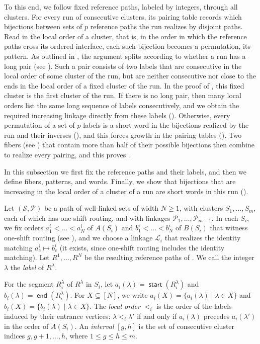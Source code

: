 \documentclass[fontsize=12pt,leading=14pt]{fullpaper}
\DeclareMathOperator{\st}{\mathsf{start}}
\DeclareMathOperator{\en}{\mathsf{end}}
\newcommand{\Lcal}{\mathcal{L}}
\newcommand{\Pcal}{\mathcal{P}}
\newcommand{\Scal}{\mathcal{S}}
\newcounter{step}
\begin{document}
To this end, we follow fixed reference paths, labeled by integers, through all clusters.
For every run of consecutive clusters, its pairing table records which bijections between sets of $p$ reference paths the run realizes by disjoint paths.
Read in the local order of a cluster, that is, in the order in which the reference paths cross its ordered interface, each such bijection becomes a permutation, its pattern.
As outlined in , the argument splits according to whether a run has a long pair (see ).
Such a pair consists of two labels that are consecutive in the local order of some cluster of the run, but are neither consecutive nor close to the ends in the local order of a fixed cluster of the run.
In the proof of , this fixed cluster is the first cluster of the run.
If there is no long pair, then many local orders list the same long sequence of labels consecutively, and we obtain the required increasing linkage directly from these labels ().
Otherwise, every permutation of a set of $p$ labels is a short word in the bijections realized by the run and their inverses (), and this forces growth in the pairing tables ().
Two fibers (see ) that contain more than half of their possible bijections then combine to realize every pairing, and this proves .

In this subsection we first fix the reference paths and their labels, and then we define fibers, patterns, and words.
Finally, we show that bijections that are increasing in the local order of a cluster of a run are short words in this run ().

\begin{definition}\label{def:s3-oneshift-refs}
  Let $(\Scal,\Pcal)$ be a path of well-linked sets of width $N\ge1$, with clusters $S_1,\dots,S_m$, each of which has one-shift routing, and with linkages $\Pcal_1,\dots,\Pcal_{m-1}$.
  In each $S_i$, we fix orders $a^i_1<\dots<a^i_N$ of $A(S_i)$ and $b^i_1<\dots<b^i_N$ of $B(S_i)$ that witness one-shift routing (see ), and we choose a linkage $\Lcal_i$ that realizes the identity matching $a^i_c\mapsto b^i_c$ (it exists, since one-shift routing includes the identity matching).
  Let $R^1,\dots,R^N$ be the resulting reference paths of .
  We call the integer $\lambda$ the \emph{label} of $R^\lambda$.

  For the segment $R^\lambda_i$ of $R^\lambda$ in $S_i$, let $a_i(\lambda)=\st(R^\lambda_i)$ and $b_i(\lambda)=\en(R^\lambda_i)$.
  For $X\subseteq[N]$, we write $a_i(X)=\{a_i(\lambda)\mid\lambda\in X\}$ and $b_i(X)=\{b_i(\lambda)\mid\lambda\in X\}$.
  The \emph{local order} $<_i$ is the order of the labels induced by their entrance vertices: $\lambda<_i\lambda'$ if and only if $a_i(\lambda)$ precedes $a_i(\lambda')$ in the order of $A(S_i)$.
  An \emph{interval} $[g,h]$ is the set of consecutive cluster indices $g,g+1,\dots,h$, where $1\le g\le h\le m$.
\end{definition}
\end{document}
